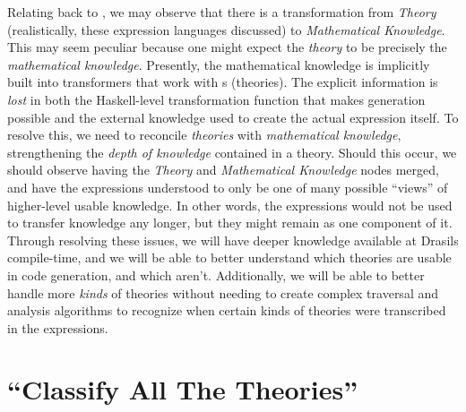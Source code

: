 Relating back to , we may observe that there is a
transformation from \textit{Theory} (realistically, these expression languages
discussed) to \textit{Mathematical Knowledge}. This may seem peculiar because
one might expect the \textit{theory} to be precisely the \textit{mathematical
	knowledge}. Presently, the mathematical knowledge is implicitly built into
transformers that work with \RelationConcept{}s (theories). The explicit
information is \textit{lost} in both the Haskell-level transformation function
that makes generation possible and the external knowledge used to create the
actual expression itself. To resolve this, we need to reconcile
\textit{theories} with \textit{mathematical knowledge}, strengthening the
\textit{depth of knowledge} contained in a theory. Should this occur, we should
observe  having the \textit{Theory} and
\textit{Mathematical Knowledge} nodes merged, and have the expressions
understood to only be one of many possible ``views'' of higher-level usable
knowledge. In other words, the expressions would not be used to transfer
knowledge any longer, but they might remain as one component of it. Through
resolving these issues, we will have deeper knowledge available at Drasils
compile-time, and we will be able to better understand which theories are usable
in code generation, and which aren't. Additionally, we will be able to better
handle more \textit{kinds} of theories without needing to create complex
traversal and analysis algorithms to recognize when certain kinds of theories
were transcribed in the expressions.

\section{\textquotedblleft{}Classify All The Theories\textquotedblright{}}

